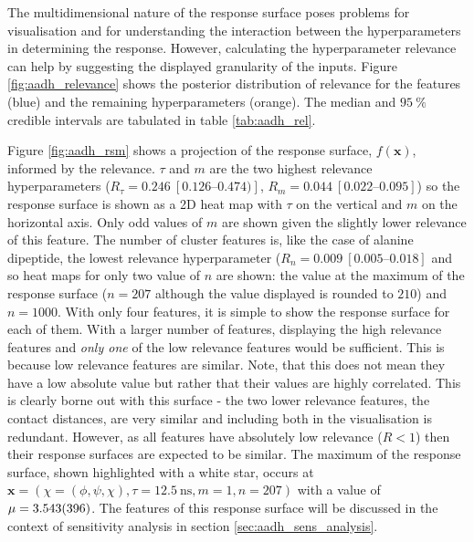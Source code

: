 The multidimensional nature of the response surface poses problems for visualisation and for understanding the interaction between the hyperparameters in determining the response. However, calculating the hyperparameter relevance can help by suggesting the displayed granularity of the inputs. Figure \ref{fig:aadh_relevance} shows the posterior distribution of relevance for the features (blue) and the remaining hyperparameters (orange). The median and $\SI{95}{\percent}$ credible intervals are tabulated in table \ref{tab:aadh_rel}. 

Figure \ref{fig:aadh_rsm} shows a projection of the response surface, $f(\mathbf{x})$, informed by the relevance. $\tau$ and $m$ are the two highest relevance hyperparameters ($R_{\tau} = \num{0.246}\ [\numrange[range-phrase=\text{--}]{0.126}{0.474})]$, $R_{m} = \num{0.044}\ [\numrange[range-phrase=\text{--}]{0.022}{0.095}]$) so the response surface is shown as a 2D heat map with $\tau$ on the vertical and $m$ on the horizontal axis. Only odd values of $m$ are shown given the slightly lower relevance of this feature. The number of cluster features is, like the case of alanine dipeptide, the lowest relevance hyperparameter ($R_{n} = \num{0.009}\ [\numrange[range-phrase=\text{--}]{0.005}{0.018}]$ and so heat maps for only two value of $n$ are shown: the value at the maximum of the response surface ($n=207$ although the value displayed is rounded to $210$) and $n=1000$. With only four features, it is  simple to show the response surface for each of them. With a larger number of features, displaying the high relevance features and \emph{only one} of the low relevance features would be sufficient. This is because low relevance features are similar.  Note, that this does not mean they have a low absolute value but rather that their values are highly correlated. This is clearly borne out with this surface - the two lower relevance features, the contact distances, are very similar and including both in the visualisation is redundant. However, as all features have absolutely low relevance ($R<1$) then their response surfaces are expected to be similar. The maximum of the response surface, shown highlighted with a  white star, occurs at $\mathbf{x}=\left(\chi=(\phi, \psi, \chi), \tau = \SI{12.5}{\nano\second}, m=1, n=207\right)$ with a value of $\mu=\num{3.543 \pm 0.396}$. The features of this response surface will be discussed in the context of sensitivity analysis in section \ref{sec:aadh_sens_analysis}. 

